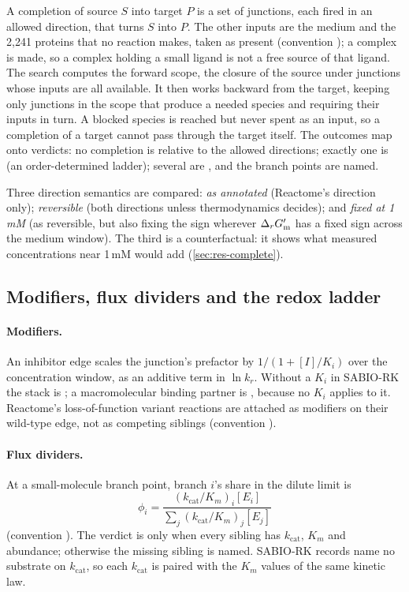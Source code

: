 A completion of source $S$ into target $P$ is a set of junctions, each fired in an allowed direction, that turns $S$ into $P$.
The other inputs are the medium and the 2{,}241 proteins that no reaction makes, taken as present (convention ); a complex is made, so a complex holding a small ligand is not a free source of that ligand.
The search computes the forward scope, the closure of the source under junctions whose inputs are all available.
It then works backward from the target, keeping only junctions in the scope that produce a needed species and requiring their inputs in turn.
A blocked species is reached but never spent as an input, so a completion of a target cannot pass through the target itself.
The outcomes map onto verdicts: no completion is  relative to the allowed directions; exactly one is  (an order-determined ladder); several are , and the branch points are named.

Three direction semantics are compared:
\emph{as annotated} (Reactome's direction only);
\emph{reversible} (both directions unless thermodynamics decides); and
\emph{fixed at 1\,mM} (as reversible, but also fixing the sign wherever $\Delta_r G'_{\mathrm{m}}$ has a fixed sign across the medium window).
The third is a counterfactual: it shows what measured concentrations near 1\,mM would add (\cref{sec:res-complete}).

\subsection{Modifiers, flux dividers and the redox ladder}
\label{sec:modifiers}

\paragraph{Modifiers.}
An inhibitor edge scales the junction's prefactor by $1/(1+[I]/K_i)$ over the concentration window, as an additive term in $\ln k_r$.
Without a $K_i$ in SABIO-RK the stack is ; a macromolecular binding partner is , because no $K_i$ applies to it.
Reactome's loss-of-function variant reactions are attached as modifiers on their wild-type edge, not as competing siblings (convention ).

\paragraph{Flux dividers.}
At a small-molecule branch point, branch $i$'s share in the dilute limit is
\begin{equation}
  \phi_i=\frac{(k_{\mathrm{cat}}/K_m)_i[E_i]}{\sum_j (k_{\mathrm{cat}}/K_m)_j[E_j]}
\end{equation}
(convention ).
The verdict is  only when every sibling has $k_{\mathrm{cat}}$, $K_m$ and abundance; otherwise the missing sibling is named.
SABIO-RK records name no substrate on $k_{\mathrm{cat}}$, so each $k_{\mathrm{cat}}$ is paired with the $K_m$ values of the same kinetic law.

